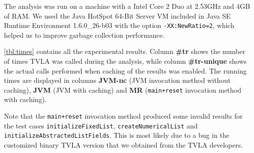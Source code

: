 \documentclass[11pt,a4paper,english]{article}
\begin{document}
The analysis was run on a machine with a Intel Core 2 Duo at 2.53GHz and 4GB of
RAM. We used the Java HotSpot 64-Bit Server VM included in Java SE Runtime
Environment 1.6.0\_26-b03 with the option \texttt{-XX:NewRatio=2}, which helped
us to improve garbage collection performance.

\autoref{tbl:times} contains all the experimental results. Column \textbf{\#tr}
shows the number of times TVLA was called during the analysis, while column
\textbf{\#tr-unique} shows the actual calls performed when caching of the results
was enabled. The running times are displayed in columns \textbf{JVM-nc} (JVM
invocation method without caching), \textbf{JVM} (JVM with caching) and
\textbf{MR} (\texttt{main+reset} invocation method with caching).

Note that the \texttt{main+reset} invocation method produced some invalid results for the test cases \texttt{initializeFixedList}, \texttt{createNumericalList} and
\texttt{initializeAbstractedListFields}. This is most likely due to a bug in the customized
binary TVLA version that we obtained from the TVLA developers.
\end{document}
